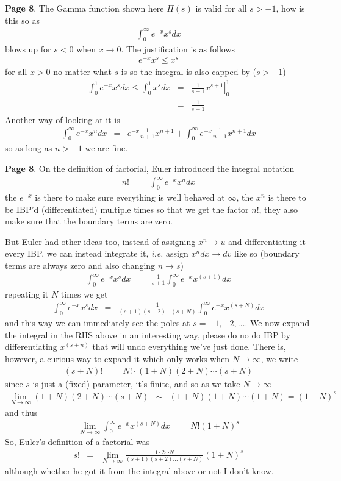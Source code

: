 \documentclass[aps,preprint,preprintnumbers,nofootinbib,showpacs,prd]{revtex4-1}
\newcommand{\ie}{{\it i.e.} }
\newcommand{\nbea}{\begin{eqnarray*}}
\newcommand{\neea}{\end{eqnarray*}}
\begin{document}
{\bf Page 8}. The Gamma function shown here $\Pi(s)$ is valid for all $s > -1$, how is this so as
%
\nbea
\int_0^\infty e^{-x} x^{s} dx
\neea
%
blows up for $s < 0$ when $x\to0$. The justification is as follows
%
\nbea
e^{-x} x^{s} \le x^s
\neea
%
for all $x > 0$ no matter what $s$ is so the integral is also capped by ($s > -1$)
%
\nbea
\int_0^1 e^{-x}x^s dx \le \int_0^1 x^s dx & = & \left.\frac{1}{s+1} x^{s+1} \right|_0^1 \\
& = & \frac{1}{s+1}
\neea
%
Another way of looking at it is
%
\nbea
\int_0^\infty e^{-x}x^n dx & = & e^{-x}\frac{1}{n+1}x^{n+1} + \int_0^\infty e^{-x}\frac{1}{n+1}x^{n+1} dx
\neea
%
so as long as $n>-1$ we are fine.


{\bf Page 8}. On the definition of factorial, Euler introduced the integral notation
%
\nbea
n! & = & \int_0^\infty e^{-x} x^n dx
\neea
%
the $e^{-x}$ is there to make sure everything is well behaved at $\infty$, the $x^n$ is there to be IBP'd (differentiated) multiple times so that we get the factor $n!$, they also make sure that the boundary terms are zero.

But Euler had other ideas too, instead of assigning $x^n \to u$ and differentiating it every IBP, we can instead integrate it, \ie assign $x^n dx \to dv$ like so (boundary terms are always zero and also changing $n\to s$)
%
\nbea
\int_0^\infty e^{-x} x^s dx & = & \frac{1}{s+1} \int_0^\infty e^{-x} x^{(s+1)} dx
\neea
%
repeating it $N$ times we get
%
\nbea
\int_0^\infty e^{-x} x^s dx & = & \frac{1}{(s+1)(s+2) \dots (s+N)} \int_0^\infty e^{-x} x^{(s+N)} dx
\neea
%
and this way we can immediately see the poles at $s = -1, -2, \dots$. We now expand the integral in the RHS above in an interesting way, please do no do IBP by differentiating $x^{(s+n)}$ that will undo everything we've just done. There is, however, a curious way to expand it which only works when $N\to\infty$, we write
%
\nbea
(s + N)! & = & N! \cdot (1 + N)(2 + N) \cdots (s+N)
\neea
%
since $s$ is just a (fixed) parameter, it's finite, and so as we take $N\to\infty$
%
\nbea
\lim_{N\to\infty} (1 + N)(2 + N) \cdots (s+N) & \sim & (1 + N)(1 + N) \cdots (1+N) = (1+N)^s
\neea
%
and thus
%
\nbea
\lim_{N\to\infty}\int_0^\infty e^{-x} x^{(s+N)} dx & = & N! (1+N)^s
\neea
%
So, Euler's definition of a factorial was
%
\nbea
s! & = & \lim_{N\to\infty} \frac{1\cdot2\cdots N}{(s+1)(s+2) \dots (s+N)} (1+N)^s
\neea
%
although whether he got it from the integral above or not I don't know.
\end{document}
